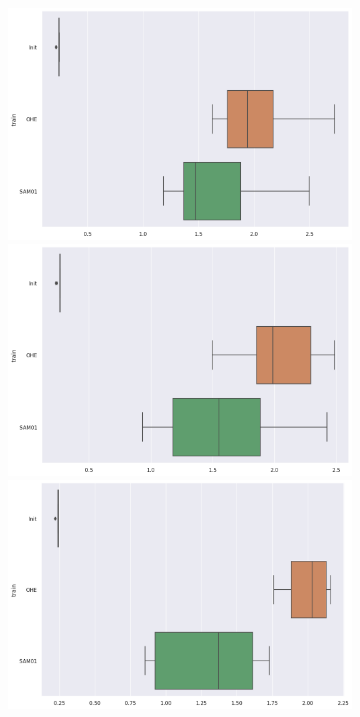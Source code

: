 \documentclass{article}
\theoremstyle{definition}
\begin{document}
\begin{figure}[ht]
     \centering
     \begin{subfigure}[b]{0.15\textwidth}
         \centering
         \includegraphics[width=\textwidth]{imgs/Illu/1000Epochs/Imb/Boxplots_predTest_Lat.png}
         \quad
         \includegraphics[width=\textwidth]{imgs/Illu/2000Epochs/Imb/Boxplots_predTest_Lat.png}
         \quad
         \includegraphics[width=\textwidth]{imgs/Illu/3000Epochs/Imb/Boxplots_predTest_Lat.png}       

\end{subfigure}
\end{figure}
\end{document}
